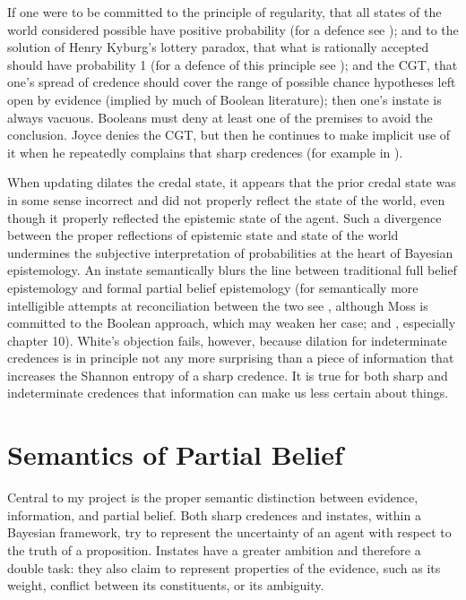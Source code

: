 \documentclass[11pt]{article}
\begin{document}
If one were to be committed to the principle of regularity, that all
states of the world considered possible have positive probability (for
a defence see ); and to the solution of
Henry Kyburg's lottery paradox, that what is rationally accepted
should have probability 1 (for a defence of this principle see
); and the CGT, that one's spread of
credence should cover the range of possible chance hypotheses left
open by evidence (implied by much of Boolean literature); then one's
instate is always vacuous. Booleans must deny at least one of the
premises to avoid the conclusion. Joyce denies the CGT, but then he
continues to make implicit use of it when he repeatedly complains that
sharp credences  (for example in
).

When updating dilates the credal state, it appears that the prior
credal state was in some sense incorrect and did not properly reflect
the state of the world, even though it properly reflected the
epistemic state of the agent. Such a divergence between the proper
reflections of epistemic state and state of the world undermines the
subjective interpretation of probabilities at the heart of Bayesian
epistemology. An instate semantically blurs the line between
traditional full belief epistemology and formal partial belief
epistemology (for semantically more intelligible attempts at
reconciliation between the two see , although Moss
is committed to the Boolean approach, which may weaken her case; and
, especially chapter 10). White's objection fails,
however, because dilation for indeterminate credences is in principle
not any more surprising than a piece of information that increases the
Shannon entropy of a sharp credence. It is true for both sharp and
indeterminate credences that information can make us less certain
about things.

\section{Semantics of Partial Belief}
\label{SemanticsOfPartialBelief}
Central to my project is the proper semantic distinction between
evidence, information, and partial belief. Both sharp credences and
instates, within a Bayesian framework, try to represent the
uncertainty of an agent with respect to the truth of a proposition.
Instates have a greater ambition and therefore a double task: they
also claim to represent properties of the evidence, such as its
weight, conflict between its constituents, or its ambiguity.
\end{document}
